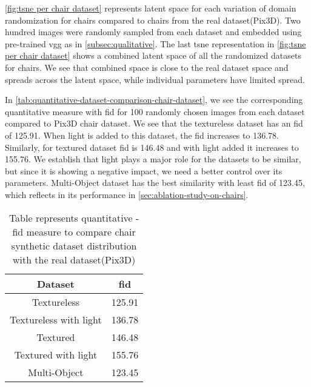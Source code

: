 \autoref{fig:tsne per chair dataset} represents latent space for each variation of domain randomization for chairs compared to chairs from the real dataset(Pix3D).
Two hundred images were randomly sampled from each dataset and embedded using pre-trained \gls{vgg} as in \autoref{subsec:qualitative}.
The last \gls{tsne} representation in \autoref{fig:tsne per chair dataset} shows a combined latent space of all the randomized datasets for chairs.
We see that combined space is close to the real dataset space and spreads across the latent space, while individual parameters have limited spread.

In \autoref{tab:quantitative-dataset-comparison-chair-dataset}, we see the corresponding quantitative measure with \gls{fid} for 100 randomly chosen images from each dataset compared to Pix3D chair dataset.
We see that the textureless dataset has an \gls{fid} of 125.91.
When light is added to this dataset, the \gls{fid} increases to 136.78.
Similarly, for textured dataset \gls{fid} is 146.48 and with light added it increases to 155.76.
We establish that light plays a major role for the datasets to be similar, but since it is showing a negative impact, we need a better control over its parameters.
Multi-Object dataset has the best similarity with least \gls{fid} of 123.45, which reflects in its performance in \autoref{sec:ablation-study-on-chairs}.

\begin{table}[ht]
    \centering
    \begin{tabular}{|c |c |}
        \hline
        Dataset & \gls{fid} \\ [0.5ex]
        \hline\hline
        Textureless & 125.91 \\
        \hline
        Textureless with light & 136.78 \\
        \hline
        Textured  & 146.48 \\
        \hline
        Textured with light  & 155.76 \\
        \hline
        Multi-Object & 123.45 \\[1ex]
        \hline
    \end{tabular}
    \caption{Table represents quantitative - \gls{fid} measure to compare chair synthetic dataset distribution with the real dataset(Pix3D)}
    \label{tab:quantitative-dataset-comparison-chair-dataset}
\end{table}

